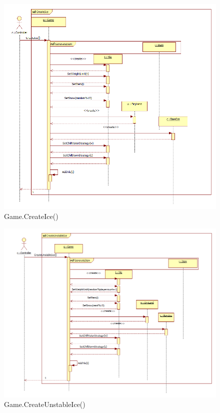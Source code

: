 \begin{figure}[H]
	\begin{center}
		\includegraphics[width=15cm]{chapters/chapter03/seqdiag/Game_CreateIce.png}
		\caption{Game.CreateIce()}
		\label{fig:GameCreateIce}
	\end{center}
\end{figure}
\begin{figure}[H]
	\begin{center}
		\includegraphics[width=17cm]{chapters/chapter03/seqdiag/Game_CreateUnstableIce.png}
		\caption{Game.CreateUnstableIce()}
		\label{fig:GameCreateUnstableIce}
	\end{center}
\end{figure}
